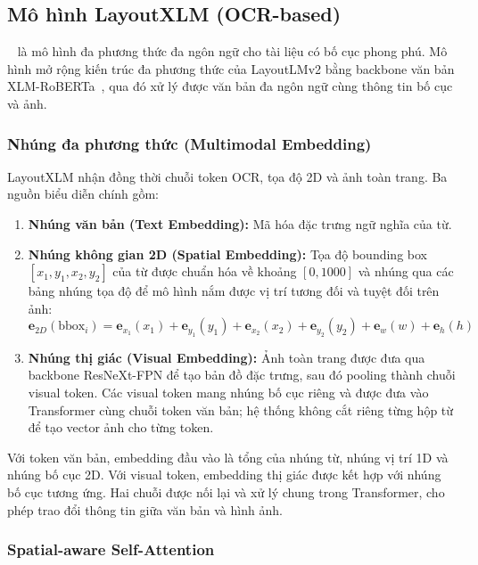 \subsection{Mô hình LayoutXLM (OCR-based)}
\label{subsec:layoutxlm}

~\cite{xu2021layoutxlm} là mô hình đa phương thức đa ngôn ngữ cho tài liệu có bố cục phong phú. Mô hình mở rộng kiến trúc đa phương thức của LayoutLMv2 bằng backbone văn bản XLM-RoBERTa~\cite{conneau2020xlmr}, qua đó xử lý được văn bản đa ngôn ngữ cùng thông tin bố cục và ảnh.

\subsubsection{Nhúng đa phương thức (Multimodal Embedding)}
\label{subsubsec:multimodal_embedding}

LayoutXLM nhận đồng thời chuỗi token OCR, tọa độ 2D và ảnh toàn trang. Ba nguồn biểu diễn chính gồm:
\begin{enumerate}
  \item \textbf{Nhúng văn bản (Text Embedding):} Mã hóa đặc trưng ngữ nghĩa của từ.
  \item \textbf{Nhúng không gian 2D (Spatial Embedding):} Tọa độ bounding box $[x_1, y_1, x_2, y_2]$ của từ được chuẩn hóa về khoảng $[0, 1000]$ và nhúng qua các bảng nhúng tọa độ để mô hình nắm được vị trí tương đối và tuyệt đối trên ảnh:
  \begin{equation}
    \mathbf{e}_{2D}(\text{bbox}_i) = \mathbf{e}_{x_1}(x_1) + \mathbf{e}_{y_1}(y_1) + \mathbf{e}_{x_2}(x_2) + \mathbf{e}_{y_2}(y_2) + \mathbf{e}_{w}(w) + \mathbf{e}_{h}(h)
  \end{equation}
  \item \textbf{Nhúng thị giác (Visual Embedding):} Ảnh toàn trang được đưa qua backbone ResNeXt-FPN để tạo bản đồ đặc trưng, sau đó pooling thành chuỗi visual token. Các visual token mang nhúng bố cục riêng và được đưa vào Transformer cùng chuỗi token văn bản; hệ thống không cắt riêng từng hộp từ để tạo vector ảnh cho từng token.
\end{enumerate}

Với token văn bản, embedding đầu vào là tổng của nhúng từ, nhúng vị trí 1D và nhúng bố cục 2D. Với visual token, embedding thị giác được kết hợp với nhúng bố cục tương ứng. Hai chuỗi được nối lại và xử lý chung trong Transformer, cho phép trao đổi thông tin giữa văn bản và hình ảnh.

\subsubsection{Spatial-aware Self-Attention}
\label{subsubsec:spatial_attention}

